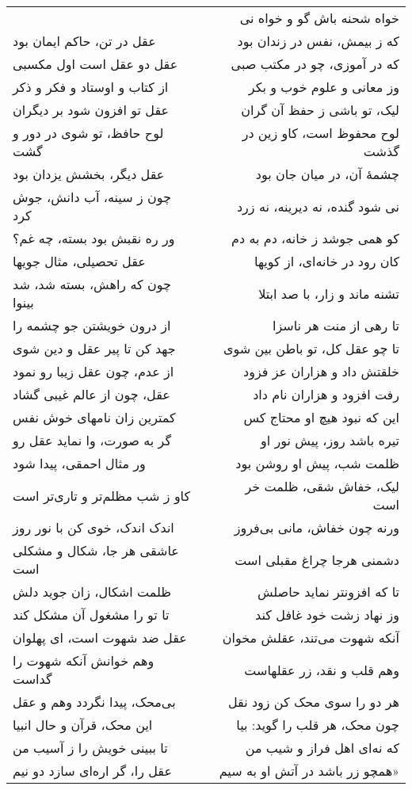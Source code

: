\begin{center}
\begin{longtable}{l p{0.5cm} r}
&&
خواه شحنه باش گو و خواه نی
\\
عقل در تن، حاکم ایمان بود
&&
که ز بیمش، نفس در زندان بود
\\
عقل دو عقل است اول مکسبی
&&
که در آموزی، چو در مکتب صبی
\\
از کتاب و اوستاد و فکر و ذکر
&&
وز معانی و علوم خوب و بکر
\\
عقل تو افزون شود بر دیگران
&&
لیک، تو باشی ز حفظ آن گران
\\
لوح حافظ، تو شوی در دور و گشت
&&
لوح محفوظ است، کاو زین در گذشت
\\
عقل دیگر، بخشش یزدان بود
&&
چشمهٔ آن، در میان جان بود
\\
چون ز سینه، آب دانش، جوش کرد
&&
نی شود گنده، نه دیرینه، نه زرد
\\
ور ره نقبش بود بسته، چه غم؟
&&
کو همی جوشد ز خانه، دم به دم
\\
عقل تحصیلی، مثال جویها
&&
کان رود در خانه‌ای، از کویها
\\
چون که راهش، بسته شد، شد بینوا
&&
تشنه ماند و زار، با صد ابتلا
\\
از درون خویشتن جو چشمه را
&&
تا رهی از منت هر ناسزا
\\
جهد کن تا پیر عقل و دین شوی
&&
تا چو عقل کل، تو باطن بین شوی
\\
از عدم، چون عقل زیبا رو نمود
&&
خلقتش داد و هزاران عز فزود
\\
عقل، چون از عالم غیبی گشاد
&&
رفت افزود و هزاران نام داد
\\
کمترین زان نامهای خوش نفس
&&
این که نبود هیچ او محتاج کس
\\
گر به صورت، وا نماید عقل رو
&&
تیره باشد روز، پیش نور او
\\
ور مثال احمقی، پیدا شود
&&
ظلمت شب، پیش او روشن بود
\\
کاو ز شب مظلم‌تر و تاری‌تر است
&&
لیک، خفاش شقی، ظلمت خر است
\\
اندک اندک، خوی کن با نور روز
&&
ورنه چون خفاش، مانی بی‌فروز
\\
عاشقی هر جا، شکال و مشکلی است
&&
دشمنی هرجا چراغ مقبلی است
\\
ظلمت اشکال، زان جوید دلش
&&
تا که افزونتر نماید حاصلش
\\
تا تو را مشغول آن مشکل کند
&&
وز نهاد زشت خود غافل کند
\\
عقل ضد شهوت است، ای پهلوان
&&
آنکه شهوت می‌تند، عقلش مخوان
\\
وهم خوانش آنکه شهوت را گداست
&&
وهم قلب و نقد، زر عقلهاست
\\
بی‌محک، پیدا نگردد وهم و عقل
&&
هر دو را سوی محک کن زود نقل
\\
این محک، قرآن و حال انبیا
&&
چون محک، هر قلب را گوید: بیا
\\
تا ببینی خویش را ز آسیب من
&&
که نه‌ای اهل فراز و شیب من
\\
عقل را، گر اره‌ای سازد دو نیم
&&
همچو زر باشد در آتش او به سیم»
\\
\end{longtable}
\end{center}
